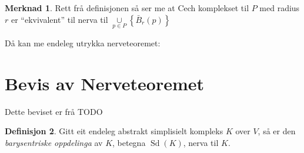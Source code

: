 \documentclass[a4paper, titlepage, 12pt, norsk]{article}
\theoremstyle{plain}
\newtheorem{theorem}{Teorem}[section]
\theoremstyle{definition}
\newtheorem{definition}[theorem]{Definisjon}
\newtheorem{remark}[theorem]{Merknad}
\newcommand{\Nc}{\mathcal{N}}
\newcommand{\intersect}{ \mathop{\cap}\limits } %
\newcommand{\union}{ \mathop{\cup}\limits }
\newcommand{\gr}[1]{ \lvert #1 \rvert } %
\newcommand{\set}[1]{ \left \{ #1 \right \} } %
\DeclareMathOperator{\Sd}{Sd}
\begin{document}
\begin{theroem}
\begin{remark}
	Rett frå definisjonen så ser me at Cech komplekset til $P$ med radius $r$ er ``ekvivalent'' til nerva til $\union_{p \in P} \left \{ \bar{B}_r(p) \right \}$
\end{remark}

Då kan me endeleg utrykka nerveteoremet:


%	

%
%

\section{Bevis av Nerveteoremet}

Dette beviset er frå TODO

\begin{definition}
	Gitt eit endeleg abstrakt simplisielt kompleks \( K \) over \( V \), så er den \emph{barysentriske oppdelinga} av \( K \), betegna \( \Sd(K) \), nerva til \( K \).
\end{definition}


\end{theroem}
\end{document}
